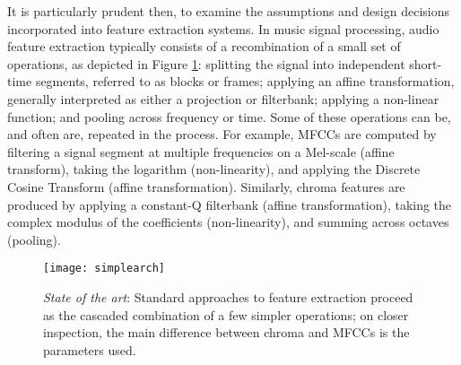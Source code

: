 It is particularly prudent then, to examine the assumptions and design decisions incorporated into feature extraction systems.
In music signal processing, audio feature extraction typically consists of a recombination of a small set of operations, as depicted in Figure \ref{fig:simplearch}: splitting the signal into independent short-time segments, referred to as blocks or frames; applying an affine transformation, generally interpreted as either a projection or filterbank; applying a non-linear function; and pooling across frequency or time.
Some of these operations can be, and often are, repeated in the process.
For example, MFCCs are computed by filtering a signal segment at multiple frequencies on a Mel-scale (affine transform), taking the logarithm (non-linearity), and applying the Discrete Cosine Transform (affine transformation).
Similarly, chroma features are produced by applying a constant-Q filterbank (affine transformation), taking the complex modulus of the coefficients (non-linearity), and summing across octaves (pooling).

\begin{figure}[t]
\begin{centering}
\texttt{[image: simplearch]}
\caption{\emph{State of the art}: Standard approaches to feature extraction proceed as the cascaded combination of a few simpler operations; on closer inspection, the main difference between chroma and MFCCs is the parameters used.}
\label{fig:simplearch}
\end{centering}
\end{figure}


